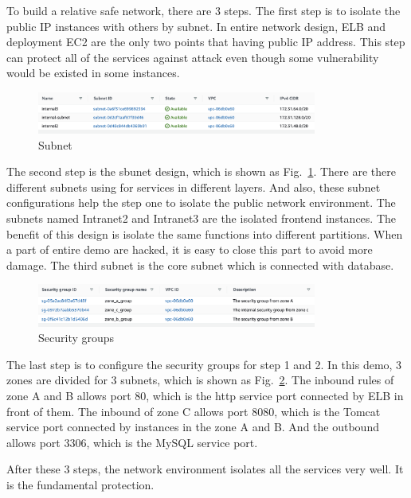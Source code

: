 \documentclass[conference]{IEEEtran}
\begin{document}
To build a relative safe network, there are 3 steps. The first step is to isolate the public IP instances with others by subnet. In entire network design, 
ELB and deployment EC2 are the only two points that having public IP address. This step can protect all of the services against attack even though some vulnerability 
would be existed in some instances.

\begin{figure}[htbp]
    \centerline{\includegraphics[width=260pt]{images/subnet.png}}
    \caption{Subnet}
    \label{subnet}
\end{figure}

The second step is the sbunet design, which is shown as Fig.~\ref{subnet}. There are there different subnets using for services in different layers. And also, 
these subnet configurations help the step one to isolate the public network environment. The subnets named Intranet2 and Intranet3 are the isolated frontend 
instances. The benefit of this design is isolate the same functions into different partitions. When a part of entire demo are hacked, it is easy 
to close this part to avoid more damage. The third subnet is the core subnet which is connected with database.

\begin{figure}[htbp]
    \centerline{\includegraphics[width=260pt]{images/security.png}}
    \caption{Security groups}
    \label{Security}
\end{figure}

The last step is to configure the security groups for step 1 and 2. In this demo, 3 zones are divided for 3 subnets, which is shown as Fig.~\ref{Security}. The inbound 
rules of zone A and B allows port 80, which is the http service port connected by ELB in front of them. The inbound of zone C allows port 8080, which is the Tomcat 
service port connected by instances in the zone A and B. And the outbound allows port 3306, which is the MySQL service port.

After these 3 steps, the network environment isolates all the services very well. It is the fundamental protection.
\end{document}
